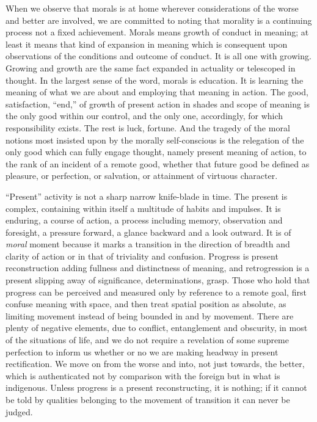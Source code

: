 \documentclass[12pt]{article}
\begin{document}
When we observe that morals is at home wherever
considerations of the worse and better are involved, we
are committed to noting that morality is a continuing
process not a fixed achievement. Morals means growth
of conduct in meaning; at least it means that kind of
expansion in meaning which is consequent upon observations
of the conditions and outcome of conduct. It
is all one with growing. Growing and growth are the
same fact expanded in actuality or telescoped in
thought. In the largest sense of the word, morals is
education. It is learning the meaning of what we are
about and employing that meaning in action. The
good, satisfaction, ``end,'' of growth of present action
in shades and scope of meaning is the only good within
our control, and the only one, accordingly, for which
responsibility exists. The rest is luck, fortune. And
the tragedy of the moral notions most insisted upon by
the morally self-conscious is the relegation of the only
good which can fully engage thought, namely present
meaning of action, to the rank of an incident of a remote
good, whether that future good be defined as
pleasure, or perfection, or salvation, or attainment of
virtuous character.

``Present'' activity is not a sharp narrow knife-blade
in time. The present is complex, containing
within itself a multitude of habits and impulses. It is
enduring, a course of action, a process including memory,
observation and foresight, a pressure forward, a
glance backward and a look outward. It is of \emph{moral}
moment because it marks a transition in the direction
of breadth and clarity of action or in that of triviality
and confusion. Progress is present reconstruction adding
fullness and distinctness of meaning, and retrogression
is a present slipping away of significance, determinations,
grasp. Those who hold that progress can
be perceived and measured only by reference to a remote
goal, first confuse meaning with space, and then treat
spatial position as absolute, as limiting movement instead
of being bounded in and by movement. There are
plenty of negative elements, due to conflict, entanglement
and obscurity, in most of the situations of life,
and we do not require a revelation of some supreme
perfection to inform us whether or no we are making
headway in present rectification. We move on from
the worse and into, not just towards, the better, which
is authenticated not by comparison with the foreign but
in what is indigenous. Unless progress is a present
reconstructing, it is nothing; if it cannot be told by
qualities belonging to the movement of transition it
can never be judged.
\end{document}
